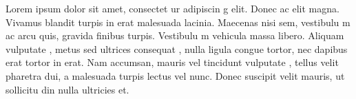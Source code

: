 Lorem
ipsum
dolor sit
amet,
consectet
ur
adipiscin
g elit.
Donec ac
elit
magna.
Vivamus
blandit
turpis in
erat
malesuada
lacinia.
Maecenas
nisi sem,
vestibulu
m ac arcu
quis,
gravida
finibus
turpis.
Vestibulu
m
vehicula
massa
libero.
Aliquam
vulputate
, metus
sed
ultrices
consequat
, nulla
ligula
congue
tortor,
nec
dapibus
erat
tortor in
erat. Nam
accumsan,
mauris
vel
tincidunt
vulputate
, tellus
velit
pharetra
dui, a
malesuada
turpis
lectus
vel nunc.
Donec
suscipit
velit
mauris,
ut
sollicitu
din nulla
ultricies
et.
